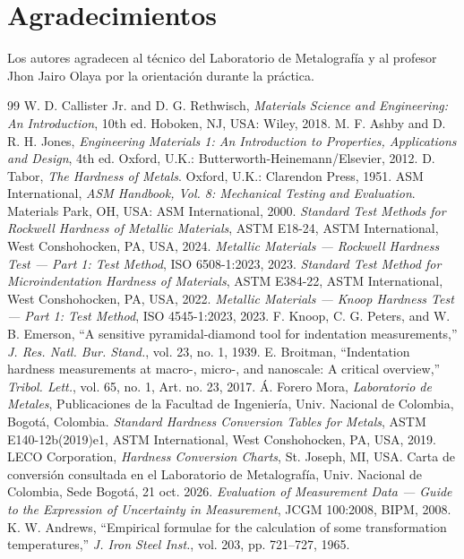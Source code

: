 \documentclass[journal,11pt]{IEEEtran}
\begin{document}
\section*{Agradecimientos}
Los autores agradecen al técnico del Laboratorio de Metalografía y al profesor Jhon Jairo Olaya por la orientación durante la práctica.

\begin{thebibliography}{99}
 W. D. Callister Jr. and D. G. Rethwisch, \emph{Materials Science and Engineering: An Introduction}, 10th ed. Hoboken, NJ, USA: Wiley, 2018.
 M. F. Ashby and D. R. H. Jones, \emph{Engineering Materials 1: An Introduction to Properties, Applications and Design}, 4th ed. Oxford, U.K.: Butterworth-Heinemann/Elsevier, 2012.
 D. Tabor, \emph{The Hardness of Metals}. Oxford, U.K.: Clarendon Press, 1951.
 ASM International, \emph{ASM Handbook, Vol. 8: Mechanical Testing and Evaluation}. Materials Park, OH, USA: ASM International, 2000.
 \emph{Standard Test Methods for Rockwell Hardness of Metallic Materials}, ASTM E18-24, ASTM International, West Conshohocken, PA, USA, 2024.
 \emph{Metallic Materials --- Rockwell Hardness Test --- Part 1: Test Method}, ISO 6508-1:2023, 2023.
 \emph{Standard Test Method for Microindentation Hardness of Materials}, ASTM E384-22, ASTM International, West Conshohocken, PA, USA, 2022.
 \emph{Metallic Materials --- Knoop Hardness Test --- Part 1: Test Method}, ISO 4545-1:2023, 2023.
 F. Knoop, C. G. Peters, and W. B. Emerson, ``A sensitive pyramidal-diamond tool for indentation measurements,'' \emph{J. Res. Natl. Bur. Stand.}, vol. 23, no. 1, 1939.
 E. Broitman, ``Indentation hardness measurements at macro-, micro-, and nanoscale: A critical overview,'' \emph{Tribol. Lett.}, vol. 65, no. 1, Art. no. 23, 2017.
 \'A. Forero Mora, \emph{Laboratorio de Metales}, Publicaciones de la Facultad de Ingeniería, Univ. Nacional de Colombia, Bogotá, Colombia.
 \emph{Standard Hardness Conversion Tables for Metals}, ASTM E140-12b(2019)e1, ASTM International, West Conshohocken, PA, USA, 2019.
 LECO Corporation, \emph{Hardness Conversion Charts}, St. Joseph, MI, USA. Carta de conversión consultada en el Laboratorio de Metalografía, Univ. Nacional de Colombia, Sede Bogotá, 21 oct. 2026.
 \emph{Evaluation of Measurement Data --- Guide to the Expression of Uncertainty in Measurement}, JCGM 100:2008, BIPM, 2008.
 K. W. Andrews, ``Empirical formulae for the calculation of some transformation temperatures,'' \emph{J. Iron Steel Inst.}, vol. 203, pp. 721--727, 1965.
\end{thebibliography}
\end{document}
